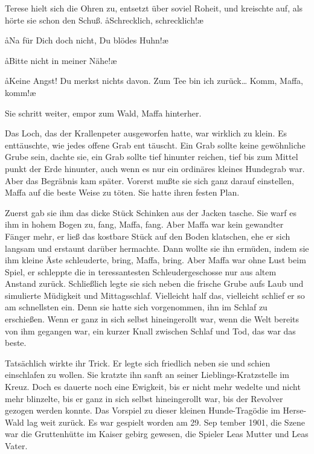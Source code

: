 Terese hielt sich die Ohren zu, entsetzt über soviel Roheit, und
kreischte auf, als hörte sie schon den Schuß. \aa Schrecklich,
schrecklich!\ae

\aa Na für Dich doch nicht, Du blödes Huhn!\ae

\aa Bitte nicht in meiner Nähe!\ae

\aa Keine Angst! Du merkst nichts davon. Zum Tee bin ich
zurück\ldots{} Komm, Maffa, komm!\ae

Sie schritt weiter, empor zum Wald, Maffa hinterher.

Das Loch, das der Krallenpeter ausgeworfen hatte, war
wirklich zu klein. Es enttäuschte, wie jedes offene Grab ent\-%
täuscht. Ein Grab sollte keine gewöhnliche Grube sein, dachte
sie, ein Grab sollte tief hinunter reichen, tief bis zum Mittel\-%
punkt der Erde hinunter, auch wenn es nur ein ordinäres
kleines Hundegrab war. Aber das Begräbnis kam später.
Vorerst mußte sie sich ganz darauf einstellen, Maffa auf die
beste Weise zu töten. Sie hatte ihren festen Plan.

Zuerst gab sie ihm das dicke Stück Schinken aus der Jacken\-%
tasche. Sie warf es ihm in hohem Bogen zu, fang, Maffa,
fang. Aber Maffa war kein gewandter Fänger mehr, er ließ
das kostbare Stück auf den Boden klatschen, ehe er sich langsam
und erstaunt darüber hermachte. Dann wollte sie ihn ermüden,
indem sie ihm kleine Äste schleuderte, bring, Maffa, bring.
Aber Maffa war ohne Lust beim Spiel, er schleppte die in\-%
teressantesten Schleudergeschosse nur aus altem Anstand
zurück. Schließlich legte sie sich neben die frische Grube aufs
Laub und simulierte Müdigkeit und Mittagsschlaf. Vielleicht
half das, vielleicht schlief er so am schnellsten ein. Denn sie
hatte sich vorgenommen, ihn im Schlaf zu erschießen. Wenn
er ganz in sich selbst hineingerollt war, wenn die Welt bereits
von ihm gegangen war, ein kurzer Knall zwischen Schlaf und
Tod, das war das beste.

Tatsächlich wirkte ihr Trick. Er legte sich friedlich neben sie
und schien einschlafen zu wollen. Sie kratzte ihn sanft an seiner
Lieblings-Kratzstelle im Kreuz. Doch es dauerte noch eine
Ewigkeit, bis er nicht mehr wedelte und nicht mehr blinzelte,
bis er ganz in sich selbst hineingerollt war, bis der Revolver
gezogen werden konnte.
\abstand
Das Vorspiel zu dieser kleinen Hunde-Tragödie im Herse-%
Wald lag weit zurück. Es war gespielt worden am 29. Sep\-%
tember 1901, die Szene war die Gruttenhütte im Kaiser\-%
gebirg gewesen, die Spieler Leas Mutter und Leas Vater.

